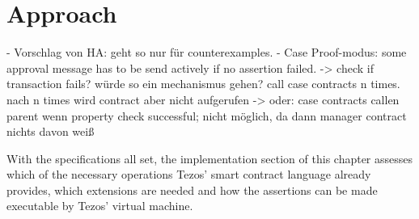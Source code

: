 \chapter{Approach}\label{chap:approach}


- Vorschlag von HA: geht so nur für counterexamples.
- Case Proof-modus: some approval message has to be send actively if no assertion failed.
	-> check if transaction fails? würde so ein mechanismus gehen? call case contracts n times. nach n times wird contract aber nicht aufgerufen
	-> oder: case contracts callen parent wenn property check successful; nicht möglich, da dann manager contract nichts davon weiß

With the specifications all set, the implementation section of this chapter assesses which of the necessary operations Tezos' smart contract language already provides, which extensions are needed and how the assertions can be made executable by Tezos' virtual machine.